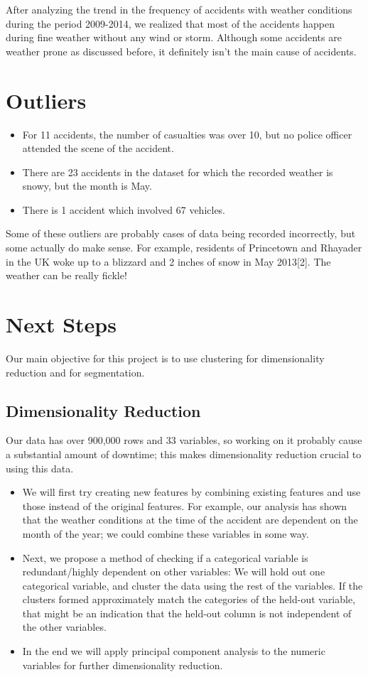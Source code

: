 \documentclass[a4paper, 10pt]{article}
\begin{document}
   After analyzing the trend in the frequency of accidents with weather conditions during the period 2009-2014, we realized that most of the accidents happen during fine weather without any wind or storm.
 Although some accidents are weather prone as discussed before, it definitely isn't the main cause of accidents. \\
   
 \section{Outliers}
 \begin{itemize}
 \item For 11 accidents, the number of casualties was over 10, but no police officer attended the scene of the accident.
 \item There are 23 accidents in the dataset for which the recorded weather is snowy, but the month is May.
 \item There is 1 accident which involved 67 vehicles.  
 \end{itemize}
 
Some of these outliers are probably cases of data being recorded incorrectly, but some actually do make sense. For example, residents of Princetown and Rhayader in the UK woke up to a blizzard and 2 inches of snow in May 2013[2]. The weather can be really fickle!

\section{Next Steps}
Our main objective for this project is to use clustering for dimensionality reduction and for segmentation.

\subsection{Dimensionality Reduction}

Our data has over 900,000 rows and 33 variables, so working on it probably cause a substantial amount of downtime; this makes dimensionality reduction crucial to using this data.

\begin{itemize}
    \item We will first try creating new features by combining existing features and use those instead of the original features. For example, our analysis has shown that the weather conditions at the time of the accident are dependent on the month of the year; we could combine these variables in some way. 
    \item Next, we propose a method of checking if a categorical variable is redundant/highly dependent on other variables: We will hold out one categorical variable, and cluster the data using the rest of the variables. If the clusters formed approximately match the categories of the held-out variable, that might be an indication that the held-out column is not independent of the other variables.
    \item In the end we will apply principal component analysis to the numeric variables for further dimensionality reduction.
\end{itemize}
\end{document}
